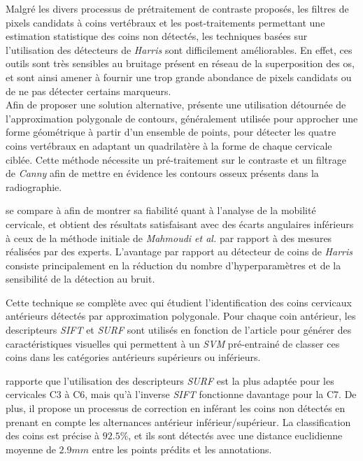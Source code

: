         Malgré les divers processus de prétraitement de contraste proposés, les filtres de pixels candidats à coins vertébraux et les post-traitements permettant une estimation statistique des coins non détectés, les techniques basées sur l'utilisation des détecteurs de {\itshape Harris} sont difficilement améliorables. En effet, ces outils sont très sensibles au bruitage présent en réseau de la superposition des os, et sont ainsi amener à fournir une trop grande abondance de pixels candidats ou de ne pas détecter certains marqueurs.
        \\

        Afin de proposer une solution alternative, \cite{Lecron2010} présente une utilisation détournée de l'approximation polygonale de contours, généralement utilisée pour approcher une forme géométrique à partir d'un ensemble de points, pour détecter les quatre coins vertébraux en adaptant un quadrilatère à la forme de chaque cervicale ciblée. Cette méthode nécessite un pré-traitement sur le contraste et un filtrage de {\itshape Canny} afin de mettre en évidence les contours osseux présents dans la radiographie.

        \cite{Lecron2010} se compare à \cite{Mahmoudi2007} afin de montrer sa fiabilité quant à l'analyse de la mobilité cervicale, et obtient des résultats satisfaisant avec des écarts angulaires inférieurs à ceux de la méthode initiale de {\itshape Mahmoudi et al.} par rapport à des mesures réalisées par des experts. L'avantage par rapport au détecteur de coins de {\itshape Harris} consiste principalement en la réduction du nombre d'hyperparamètres et de la sensibilité de la détection au bruit.

        Cette technique se complète avec \cite{Lecron2012b, Lecron2012c} qui étudient l'identification des coins cervicaux antérieurs détectés par approximation polygonale. Pour chaque coin antérieur, les descripteurs {\itshape SIFT} et {\itshape SURF} sont utilisés en fonction de l'article pour générer des caractéristiques visuelles qui permettent à un {\itshape SVM} pré-entrainé de classer ces coins dans les catégories antérieurs supérieurs ou inférieurs.

        \cite{Lecron2012a} rapporte que l'utilisation des descripteurs {\itshape SURF} est la plus adaptée pour les cervicales C3 à C6, mais qu'à l'inverse {\itshape SIFT} fonctionne davantage pour la C7. De plus, il propose un processus de correction en inférant les coins non détectés en prenant en compte les alternances antérieur inférieur/supérieur. La classification des coins est précise à $92.5\%$, et ils sont détectés avec une distance euclidienne moyenne de $2.9 mm$ entre les points prédits et les annotations.
        \\

